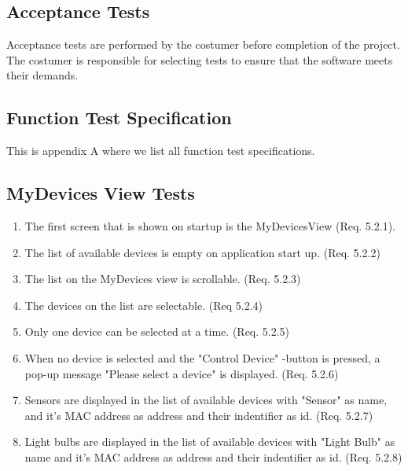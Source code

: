 \documentclass[a4paper]{article}
\newlength{\testlabellength}
\newenvironment{testlist}{\begin{enumerate}[label=\bfseries Test \thesubsection.\arabic* , labelindent=0pt, labelwidth=\testlabellength , leftmargin=2cm]}{\end{enumerate}}
\begin{document}
\subsection{Acceptance Tests}
Acceptance tests are performed by the costumer before completion of the project. The costumer is responsible for selecting tests to ensure that the software meets their demands.

\newpage
\begin{appendices}

\section{Function Test Specification} \label{appendix:section:functiontest}
This is appendix A where we list all function test specifications.

\subsection{MyDevices View Tests}
\begin{testlist}

    \item The first screen that is shown on startup is the MyDevicesView (Req. 5.2.1).
    
	\item The list of available devices is empty on application start up. (Req. 5.2.2)
   
    \item The list on the MyDevices view is scrollable. (Req. 5.2.3)
   
    \item The devices on the list are selectable. (Req 5.2.4)
   
    \item Only one device can be selected at a time. (Req. 5.2.5)
   
    \item When no device is selected and the "Control Device" -button is pressed, a pop-up message "Please select a device" is displayed. (Req. 5.2.6)
   
    \item Sensors are displayed in the list of available devices with "Sensor" as name, and it's MAC address as address and their indentifier as id. (Req. 5.2.7)
   
    \item Light bulbs are displayed in the list of available devices with "Light Bulb" as name and it's MAC address as address and their indentifier as id. (Req. 5.2.8)
   

\end{testlist}
\end{appendices}
\end{document}
